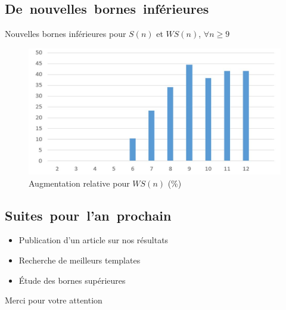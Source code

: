 \documentclass[graphics]{beamer}
\begin{document}
\subsection{De~nouvelles~bornes~inférieures}
\begin{frame}
	\begin{center}
		Nouvelles bornes inférieures pour \(S(n)\) et \(WS(n)\), \(\forall n \geqslant 9\)
	\end{center}
	\begin{figure}
	        \includegraphics[scale=0.4]{augmentation.png}
	        \caption{Augmentation relative pour \(WS(n)\) (\%)}
	\end{figure}
\end{frame}

\subsection{Suites~pour~l'an~prochain}
\begin{frame}
	\begin{itemize}
		\setlength\itemsep{2.5ex}
		\item Publication d'un article sur nos résultats
		\item Recherche de meilleurs templates
		\item Étude des bornes supérieures
	\end{itemize}
\end{frame}


\begin{frame}
	\begin{center}
		\Huge Merci pour votre attention
	\end{center}
\end{frame}
\end{document}
